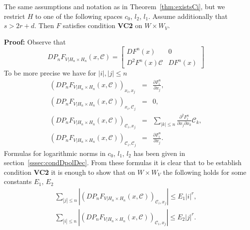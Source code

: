 \begin{lemma}
The same assumptions and notation as in Theorem~\ref{thm:existsCi}, but we restrict $H$ to one of the following spaces $c_0$, $l_2$, $l_1$. Assume additionally that $s>2r+d$. Then $F$ satisfies
condition {\bf VC2} on $W \times W_V$.
\end{lemma}
\textbf{Proof:}
Observe that
\begin{equation*}
  DP_nF_{V|H_n \times H_n}(x,\mathcal{C})= \left[\begin{array}{cc}
                                         DF^n(x)  & 0 \\
                                         D^2F^n(x)\mathcal{C} & DF^n(x)
                                        \end{array} \right]
\end{equation*}
To be more precise we have for  $|i|,|j| \leq n$
\begin{eqnarray*}
   \left(DP_nF_{V|H_n \times H_n}(x,\mathcal{C})\right)_{x_i,x_j}&=&\frac{\partial F^n_i}{\partial x_j},\\
    \left(DP_nF_{V|H_n \times H_n}(x,\mathcal{C})\right)_{x_i,\mathcal{C}_j}&=&0,  \\
     \left(DP_nF_{V|H_n \times H_n}(x,\mathcal{C})\right)_{\mathcal{C}_i,x_j}&=&\sum_{|k|\leq n}\frac{\partial^2 F^n_i}{\partial x_j\partial x_k}\mathcal{C}_k,  \\
     \left(DP_nF_{V|H_n \times H_n}(x,\mathcal{C})\right)_{\mathcal{C}_i,\mathcal{C}_j}&=&\frac{\partial F^n_i}{\partial x_j}.
\end{eqnarray*}
Formulas for logarithmic norms in $c_0$, $l_1$, $l_2$ has been given in section~\ref{sssec:condDpolDec}.  From these formulas it is clear that to be establish condition
\textbf{VC2} it is enough to show that on $W \times W_V$ the following holds for some constants $E_1$, $E_2$
\begin{eqnarray}
  \sum_{|j| \leq n}\left|   \left(DP_nF_{V|H_n \times H_n}(x,\mathcal{C})\right)_{\mathcal{C}_i,x_j} \right| \leq E_1 |i|^r,  \label{eq:var-row-sum} \\
  \sum_{|i| \leq n}\left|   \left(DP_nF_{V|H_n \times H_n}(x,\mathcal{C})\right)_{\mathcal{C}_i,x_j} \right| \leq E_2|j|^r.  \label{eq:var-col-sum}
\end{eqnarray}

